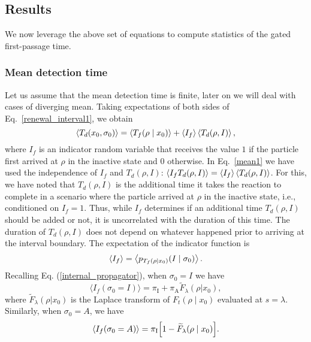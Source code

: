 \subsection{Results}

We now leverage the above set of equations to compute statistics of the gated first-passage time. 

\subsubsection{Mean detection time}\label{sub_mean_detection}

Let us assume that the mean detection time is finite, later on we will deal with cases of diverging mean.
\noindent Taking expectations of both sides of Eq.~\eqref{renewal_interval1}, we obtain
%
\begin{equation} \label{mean1}
\Braket{T_d(x_0,\sigma_0)} = \Braket{T_f(\rho \mid x_0 )} + \Braket{I_f} \Braket{T_d(\rho, I)},
\end{equation}
%
where $I_f$ is an indicator random variable that receives the
value $1$ if the particle first arrived at $\rho$ in the inactive state and $0$ otherwise. In Eq.~\eqref{mean1} we have used the independence of $I_f$ and $T_d(\rho, I)$: $\Braket{I_f T_d(\rho, I)}=\Braket{I_f} \Braket{T_d(\rho, I)}$. For this, we have noted that $T_d(\rho, I)$ is the additional time it takes the reaction to complete in a scenario where the particle arrived at $\rho$ in the inactive state, i.e., conditioned on $I_f=1$. Thus, while $I_f$ determines if an additional time $T_d(\rho, I)$ should be added or not, it is uncorrelated with the duration of this time. The duration of $T_d(\rho, I)$ does not depend on whatever happened prior to arriving at the interval boundary. The expectation of the indicator function is
%
\begin{equation} \label{mean2}
\Braket{I_f} = \Braket{p_{T_f(\rho\mid x_0 )}(I \mid \sigma_0)}.   
\end{equation}
%
Recalling Eq. (\ref{internal_propagator}), when $\sigma_0=I$ we have
%
\begin{equation} \label{mean3}
\langle I_f (\sigma_0=I) \rangle=\pi_{\textrm{I}}+\pi_{\textrm{A}}\widetilde{F}_{\lambda}(\rho | x_0),
\end{equation}
%
where $\widetilde{F}_\lambda(\rho| x_0)$ is the Laplace transform of $F_t(\rho\mid x_0)$ evaluated at $s=\lambda$.
Similarly, when $\sigma_0=A$, we have 
%
\begin{equation} \label{mean4}
\Braket{I_f (\sigma_0=A)}=\pi_{\textrm{I}}\Big[1-\widetilde{F}_\lambda(\rho \mid x_0)\Big].   
\end{equation}
